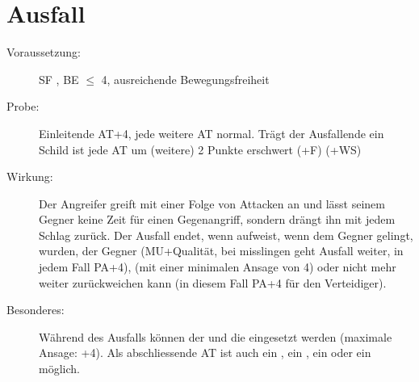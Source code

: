 \section{Ausfall}
\label{aktion.ausfall}
\begin{description}
    \item[Voraussetzung:]
        SF , BE \textrm{${\leq}$} 4, ausreichende Bewegungsfreiheit
    \item[Probe:]
        Einleitende AT+4, jede weitere AT normal.
        Trägt der Ausfallende ein Schild ist jede AT um (weitere) 2 Punkte erschwert (+F) (+WS)
    \item[Wirkung:]
        Der Angreifer greift mit einer Folge von Attacken an und lässt seinem Gegner keine Zeit für einen Gegenangriff, sondern drängt ihn mit jedem Schlag zurück.
        Der Ausfall endet, wenn  aufweist, wenn dem Gegner  gelingt,  wurden, der Gegner  (MU+Qualität, bei misslingen geht Ausfall weiter, in jedem Fall PA+4),  (mit einer minimalen Ansage von 4) oder nicht mehr weiter zurückweichen kann (in diesem Fall PA+4 für den Verteidiger).
    \item[Besonderes:]
        Während des Ausfalls können der  und die  eingesetzt werden (maximale Ansage: +4).
        Als abschliessende AT ist auch ein , ein , ein  oder ein  möglich.
\end{description}
